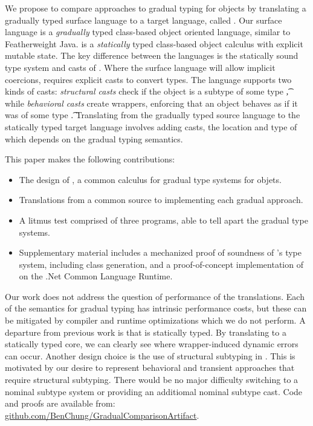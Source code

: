 \documentclass[USenglish]{tex/lipics-v2016}
\begin{document}
We propose to compare approaches to gradual typing for objects by translating
a gradually typed surface language to a target language, called \kafka. Our
surface language is a \emph{gradually} typed class-based object oriented
language, similar to Featherweight Java. \kafka is a \emph{statically} typed
class-based object calculus with explicit mutable state. The key difference
between the languages is the statically sound type system and casts of \kafka.
Where the surface language will allow implicit coercions, \kafka requires
explicit casts to convert types. The \kafka language supports two kinds of
casts: \emph{structural casts} check if the object is a subtype of some type
\t, while \emph{behavioral casts} create wrappers, enforcing that an object
behaves as if it was of some type \t. Translating from the gradually typed
source language to the statically typed target language involves adding casts,
the location and type of which depends on the gradual typing semantics.

\noindent
This paper makes the following contributions:
\begin{itemize}  
  \item The design of \kafka, a common calculus for gradual type systems for
    objets.
\item Translations from a common source to \kafka implementing each gradual
  approach.
\item A litmus test comprised of three programs, able to tell apart the
  gradual type systems.
\item Supplementary material includes a mechanized proof of soundness of
  \kafka's type system, including class generation, and a proof-of-concept
  implementation of \kafka on the .Net Common Language Runtime.
\end{itemize}

\noindent Our work does not address the question of performance of the
translations. Each of the semantics for gradual typing has intrinsic
performance costs, but these can be mitigated by compiler and runtime
optimizations which we do not perform. A departure from previous work is that
\kafka is statically typed.  By translating to a statically typed core, we can
clearly see where wrapper-induced dynamic errors can occur. Another design
choice is the use of structural subtyping in \kafka. This is motivated by our
desire to represent behavioral and transient approaches that require
structural subtyping.  There would be no major difficulty switching \kafka to
a nominal subtype system or providing an additiomal nominal subtype cast. Code
and proofs are available from: {\small
\url{github.com/BenChung/GradualComparisonArtifact}.}
\end{document}

